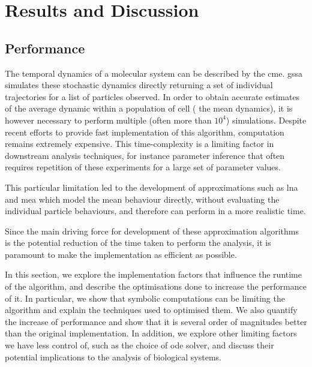 \section{Results and Discussion} \label{results}



\subsection{Performance}\label{performance}
The temporal dynamics of a molecular system can be described by the \acrfull{cme}.
\acrfull{gssa}\cite{gillespie_general_1976} simulates these stochastic dynamics directly returning a set of individual trajectories for a list of particles observed.
In order to obtain accurate estimates of the average dynamic within a population of cell (\ie{} the mean dynamics), it is however necessary to perform multiple (often more than $10^4$) simulations.
Despite recent efforts \cite{niemi_efficient_2011,dittamo_optimized_2009,komarov_accelerating_2012} to provide fast implementation of this algorithm, computation remains extremely expensive.  This time-complexity is a limiting factor in downstream analysis techniques,
for instance parameter inference that often requires repetition of these experiments for a large set of parameter values.

This particular limitation led to the development of approximations such as \acrfull{lna}\cite{komorowski_bayesian_2009} and \acrfull{mea}\cite{ale_general_2013} which model the mean behaviour directly, without evaluating the individual particle behaviours, and therefore can perform in a more realistic time.

Since the main driving force for development of these approximation algorithms is the potential reduction of the time taken to perform the  analysis, it is paramount to make the implementation as efficient as possible.

In this section, we explore the implementation factors that influence the runtime of the algorithm, and describe the optimisations done to increase the performance of it. In particular, we show that symbolic computations can be limiting the algorithm and explain the techniques used to optimised them. We also quantify the increase of performance  and show that it is several order of magnitudes better than the original \mat{} implementation.
In addition, we explore other limiting factors we have less control of, such as the choice of \gls{ode} solver, and discuss their potential implications to the analysis of biological systems.

